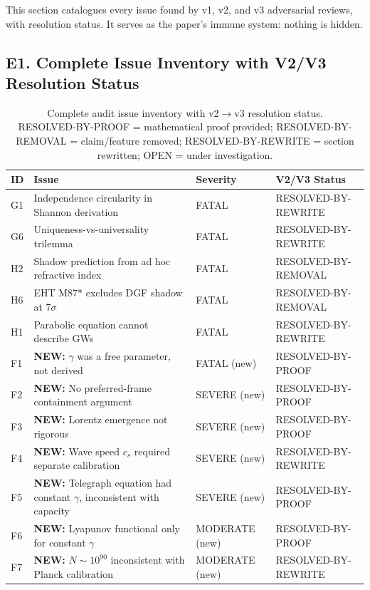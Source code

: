 \documentclass[reprint]{revtex4-2}
\begin{document}
This section catalogues every issue found by v1, v2, and v3 adversarial reviews, with resolution status. It serves as the paper's immune system: nothing is hidden.

\subsection{E1. Complete Issue Inventory with V2/V3 Resolution Status}

\begin{table}[h]
\caption{Complete audit issue inventory with v2$\to$v3 resolution status.\\
RESOLVED-BY-PROOF = mathematical proof provided; RESOLVED-BY-REMOVAL = claim/feature removed; RESOLVED-BY-REWRITE = section rewritten; OPEN = under investigation.}
\begin{tabular}{p{0.5cm}p{5.5cm}ll}
\toprule
ID & Issue & Severity & V2/V3 Status \\
\midrule
G1 & Independence circularity in Shannon derivation & FATAL & RESOLVED-BY-REWRITE \\
G6 & Uniqueness-vs-universality trilemma & FATAL & RESOLVED-BY-REWRITE \\
H2 & Shadow prediction from ad hoc refractive index & FATAL & RESOLVED-BY-REMOVAL \\
H6 & EHT M87* excludes DGF shadow at 7$\sigma$ & FATAL & RESOLVED-BY-REMOVAL \\
H1 & Parabolic equation cannot describe GWs & FATAL & RESOLVED-BY-REWRITE \\
F1 & \textbf{NEW:} $\gamma$ was a free parameter, not derived & FATAL (new) & RESOLVED-BY-PROOF \\
F2 & \textbf{NEW:} No preferred-frame containment argument & SEVERE (new) & RESOLVED-BY-PROOF \\
F3 & \textbf{NEW:} Lorentz emergence not rigorous & SEVERE (new) & RESOLVED-BY-PROOF \\
F4 & \textbf{NEW:} Wave speed $c_s$ required separate calibration & SEVERE (new) & RESOLVED-BY-REWRITE \\
F5 & \textbf{NEW:} Telegraph equation had constant $\gamma$, inconsistent with capacity & SEVERE (new) & RESOLVED-BY-PROOF \\
F6 & \textbf{NEW:} Lyapunov functional only for constant $\gamma$ & MODERATE (new) & RESOLVED-BY-PROOF \\
F7 & \textbf{NEW:} $N\sim 10^{90}$ inconsistent with Planck calibration & MODERATE (new) & RESOLVED-BY-REWRITE \\

\end{tabular}
\end{table}
\end{document}
